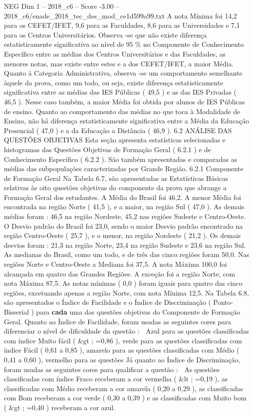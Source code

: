 \begin{textsample}{NEG Dim 1 – 2018\_c6 – Score -3.00 – 2018\_c6/enade\_2018\_tec\_des\_mod\_ce1d599a99.txt}
A nota Mínima foi 14,2 para os CEFET/IFET, 9,6 para as Faculdades, 8,6 para as Universidades e 7,1 para os Centros Universitários.
Observa -se que não existe diferença estatisticamente significativa ao nível de 95 \% no Componente de Conhecimento Específico entre as médias dos Centros Universitários e das Faculdades, as menores notas, mas existe entre estes e a dos CEFET/IFET, a maior Média.
Quanto à Categoria Administrativa, observa -se um comportamento semelhante àquele da prova, como um todo, ou seja, existe diferença estatisticamente significativa entre as médias das IES Públicas ( 49,5 ) e as das IES Privadas ( 46,5 ).
Nesse caso também, a maior Média foi obtida por alunos de IES Públicas de ensino.
Quanto ao comportamento das médias no que toca à Modalidade de Ensino, não há diferença estatisticamente significativa entre a Média da Educação Presencial ( 47,0 ) e a da Educação a Distância ( 46,9 ). 6.2 ANÁLISE DAS QUESTÕES OBJETIVAS Esta seção apresenta estatísticas selecionadas e histogramas das Questões Objetivas de Formação Geral ( 6.2.1 ) e de Conhecimento Específico ( 6.2.2 ).
São também apresentadas e comparadas as médias das subpopulações caracterizadas por Grande Região. 6.2.1 Componente de Formação Geral Na Tabela 6.7, são apresentadas as Estatísticas Básicas relativas às oito questões objetivas do componente da prova que abrange a Formação Geral dos estudantes.
A Média do Brasil foi 46,2.
A menor Média foi encontrada na região Norte ( 41,5 ), e a maior, na região Sul ( 47,0 ).
As demais médias foram : 46,5 na região Nordeste, 45,2 nas regiões Sudeste e Centro-Oeste.
O Desvio padrão do Brasil foi 23,0, sendo o maior Desvio padrão encontrado na região Centro-Oeste ( 25,7 ), e o menor, na região Nordeste ( 21,2 ).
Os demais desvios foram : 21,3 na região Norte, 23,4 na região Sudeste e 23,6 na região Sul.
As medianas do Brasil, como um todo, e de três das cinco regiões foram 50,0.
Nas regiões Norte e Centro-Oeste a Mediana foi 37,5.
A nota Máxima 100,0 foi alcançada em quatro das Grandes Regiões.
A exceção foi a região Norte, com nota Máxima 87,5.
As notas mínimas ( 0,0 ) foram iguais para quatro das cinco regiões, excetuando apenas a região Norte, com nota Mínima 12,5.
Na Tabela 6.8, são apresentados o Índice de Facilidade e o Índice de Discriminação ( Ponto-Bisserial ) para \textbf{cada} uma das questões objetivas do Componente de Formação Geral.
Quanto ao Índice de Facilidade, foram usadas as seguintes cores para diferenciar o nível de dificuldade da questão :  Azul para as questões classificadas com índice Muito fácil ( \&gt ; =0,86 ), verde para as questões classificadas com índice Fácil ( 0,61 a 0,85 ), amarelo para as questões classificadas com Médio ( 0,41 a 0,60 ), vermelho para as questões Já quanto ao Índice de Discriminação, foram usadas as seguintes cores para qualificar a questão :  As questões classificadas com índice Fraco receberam a cor vermelha ( \&lt ; =0,19 ), as classificadas com Médio receberam a cor amarela ( 0,20 a 0,29 ), as classificadas com Bom receberam a cor verde ( 0,30 a 0,39 ) e as classificadas com Muito bom ( \&gt ; =0,40 ) receberam a cor azul.

\end{textsample}
